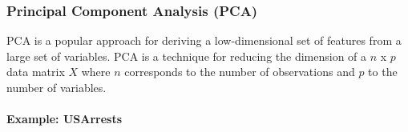 \subsubsection{Principal Component Analysis (PCA)}
{
PCA is a popular approach for deriving a low-dimensional set of features from a large set of variables. PCA is a technique for reducing the dimension of a $n$ x $p$ data matrix $X$ where $n$ corresponds to the number of observations and $p$ to the number of  variables.
\paragraph{Example: USArrests}
% 
% 
}
